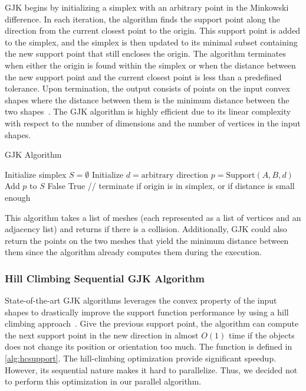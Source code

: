 \documentclass[12pt,fleqn]{article}
\begin{document}
GJK begins by initializing a simplex with an arbitrary point in the Minkowski difference.
In each iteration, the algorithm finds the support point along the direction from the current closest point to the origin.
This support point is added to the simplex, and the simplex is then updated to its minimal subset containing the new support point that still encloses the origin.
The algorithm terminates when either the origin is found within the simplex or when the distance between the new support point and the current closest point is less than a predefined tolerance.
Upon termination, the output consists of points on the input convex shapes where the distance between them is the minimum distance between the two shapes~\cite{bittle_2010,10.5555/1121584}.
The GJK algorithm is highly efficient due to its linear complexity with respect to the number of dimensions and the number of vertices in the input shapes.

\begin{algorithm}
    \caption{GJK Algorithm}
    \begin{algorithmic}[1]
        \STATE Initialize simplex $S = \emptyset$
        \STATE Initialize $d = \text{arbitrary direction}$
            \STATE $p = \text{Support} (A, B, d)$
            \STATE Add $p$ to $S$
                \RETURN False
            \ENDIF
                \RETURN True // terminate if origin is in simplex, or if distance is small enough
            \ENDIF
        \ENDWHILE
    \end{algorithmic}
\end{algorithm}

This algorithm takes a list of meshes (each represented as a list of vertices and an adjacency list) and returns if there is a collision.
Additionally, GJK could also return the points on the two meshes that yield the minimum distance between them since the algorithm already computes them during the execution.

\subsubsection{Hill Climbing Sequential GJK Algorithm}
State-of-the-art GJK algorithms leverages the convex property of the input shapes to drastically improve the support function performance by using a hill climbing approach~\cite{cameron}. Give the previous support point, the algorithm can compute the next support point in the new direction in almost $O(1)$ time if the objects does not change its position or orientation too much. The function is defined in \ref{alg:hcsupport}. The hill-climbing optimization provide significant speedup. However, its sequential nature makes it hard to parallelize. Thus, we decided not to perform this optimization in our parallel algorithm.
\end{document}
